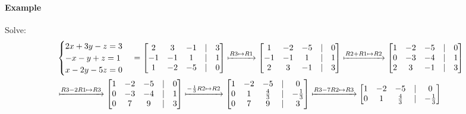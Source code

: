\paragraph*{Example} Solve:
\begin{align*}
    &\begin{cases}
        2x + 3y - z = 3 \\
        -x - y + z = 1 \\
        x - 2y -5z = 0 \\
    \end{cases} = \begin{bmatrix}
        2 & 3 & -1 & | & 3 \\
        -1 & -1 & 1 & | & 1 \\
        1 & -2 & -5 & | & 0 \\
    \end{bmatrix} \xmapsto{R3 \mapsto R1} \begin{bmatrix}
        1 & -2 & -5 & | & 0 \\
        -1 & -1 & 1 & | & 1 \\
        2 & 3 & -1 & | & 3 \\
    \end{bmatrix} \xmapsto{R2 + R1 \mapsto R2} \begin{bmatrix}
        1 & -2 & -5 & | & 0 \\
        0 & -3 & -4 & | & 1 \\
        2 & 3 & -1 & | & 3 \\
    \end{bmatrix} \\
    &\xmapsto{R3 - 2R1 \mapsto R3} \begin{bmatrix}
        1 & -2 & -5 & | & 0 \\
        0 & -3 & -4 & | & 1 \\
        0 & 7 & 9 & | & 3 \\
    \end{bmatrix} \xmapsto{-\frac{1}{3}R2 \mapsto R2} \begin{bmatrix}
        1 & -2 & -5 & | & 0 \\
        0 & 1 & \frac{4}{3} & | & -\frac{1}{3} \\
        0 & 7 & 9 & | & 3 \\
    \end{bmatrix} \xmapsto{R3 - 7R2 \mapsto R3} \begin{bmatrix}
        1 & -2 & -5 & | & 0 \\
        0 & 1 & \frac{4}{3} & | & -\frac{1}{3} \\

\end{bmatrix}
\end{align*}
